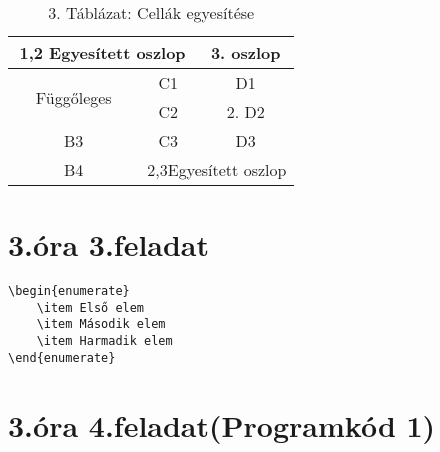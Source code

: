 \documentclass[12]{article}
\begin{document}
\begin{wraptable}{r}{0.5\textwidth} %
    \centering
    \caption{3. Táblázat: Cellák egyesítése}
    \begin{tabular}{|c|c|c|}
        \hline
        \multicolumn{2}{|c|}{1,2 Egyesített oszlop} & 3. oszlop \\ \hline
        \multirow{2}{*}{Függőleges} & C1 & D1 \\ \cline{2-3}
        & C2 & 2. D2 \\ \hline
       B3 & C3 &D3 \\ \hline
        B4 & \multicolumn{2}{c|}{2,3Egyesített oszlop} \\ \hline
    \end{tabular}
\end{wraptable}

\lipsum[5]
\newpage

\section{3.óra 3.feladat}

\begin{verbatim}
\begin{enumerate}
    \item Első elem
    \item Második elem
    \item Harmadik elem
\end{enumerate}
\end{verbatim}
\newpage

\section{3.óra 4.feladat(Programkód 1)}


\end{document}
